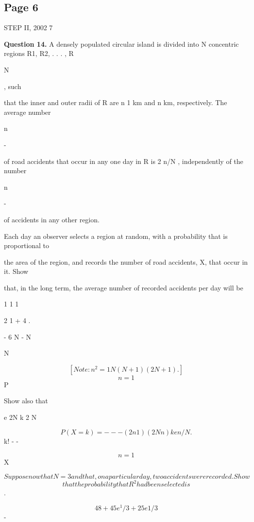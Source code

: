 \documentclass[12pt]{article}
\begin{document}
\subsection*{Page 6}
\begin{flushleft}
STEP II, 2002 7\par
\bigskip\textbf{Question 14.} A densely populated circular island is divided into N concentric regions R1, R2, . . . , R\par
N\par
, such\par
that the inner and outer radii of R are n 1 km and n km, respectively. The average number\par
n\par
-\par
of road accidents that occur in any one day in R is 2 n/N , independently of the number\par
n\par
-\par
of accidents in any other region.\par
Each day an observer selects a region at random, with a probability that is proportional to\par
the area of the region, and records the number of road accidents, X, that occur in it. Show\par
that, in the long term, the average number of recorded accidents per day will be\par
1 1 1\par
2 1 + 4 .\par
- 6 N - N\par
\lambda \mu \lambda \mu\par
N\par
\[[Note: n^2 = 1 N (N + 1)(2N + 1) .]\]
\[n=1\]
P\par
Show also that\par
e 2N k 2 N\par
\[P(X = k) = - - - (2n 1)(2N n)k en/N .\]
k! - -\par
\[n=1\]
X\par
\[Suppose now that N = 3 and that, on a particular day, two accidents were recorded. Show\]
\[that the probability that R^2 had been selected is\]
.\par
\[48 + 45 e^1/3 + 25 e 1/3\]
-\par
\end{flushleft}
\end{document}
